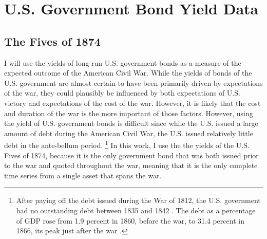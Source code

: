 \section{U.S. Government Bond Yield Data}
\label{sec:why-prices-study}



\subsection{The Fives of 1874}
\label{sec:5s-1874}

I will use the yields of long-run U.S. government bonds as a measure of the expected outcome of the American Civil War.
While the yields of bonds of the U.S. government are almost certain to have been primarily driven by expectations of the war, they could plausibly be influenced by both expectations of U.S. victory and expectations of the cost of the war.
However, it is likely that the cost and duration of the war is the more important of those factors.
However, using the yield of U.S. government bonds is difficult since while the U.S. issued a large amount of debt during the American Civil War, the U.S. issued relatively little debt in the ante-bellum period.%
\footnote{
  After paying off the debt issued during the War of 1812, the U.S. government had no outstanding debt between 1835 and 1842 \parencite[297]{HomerSylla2005}.
  The debt as a percentage of GDP rose from 1.9 percent in 1860, before the war, to 31.4 percent in 1866, its peak just after the war \parencites{CBO2012}{CBO2012a}.
}
In this work, I use the the yields of the U.S. Fives of 1874, because it is the only government bond that was both issued prior to the war and quoted throughout the war, meaning that it is the only complete time series from a single asset that spans the war.

